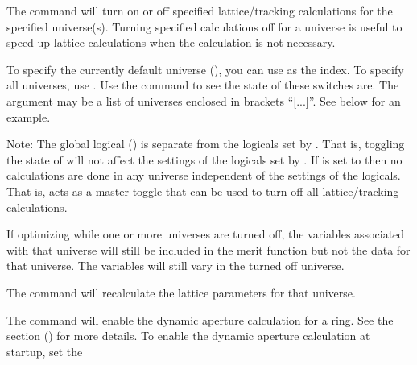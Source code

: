 {{{{{{The  command will turn on or off specified lattice/tracking
calculations for the specified universe(s). Turning specified calculations off for a universe is
useful to speed up lattice calculations when the calculation is not necessary. 

To specify the currently default universe (), you can use  as the
 index. To specify all universes, use \vn{*}. Use the  command
to see the state of these switches are. The  argument may be a list of universes
enclosed in brackets ``[...]''. See below for an example.

Note: The global logical  () is separate from the logicals set
by . That is, toggling the state of  will not affect the
settings of the logicals set by . If  is set to  then
no calculations are done in any universe independent of the settings of the 
logicals. That is,  acts as a master toggle that can be used to turn off all
lattice/tracking calculations.

If optimizing while one or more universes are turned off, the variables associated with that
universe will still be included in the merit function but not the data for that universe. The
variables will still vary in the turned off universe.

The  command will recalculate the lattice parameters
for that universe.

The  command will enable the dynamic aperture
calculation for a ring. See the  section () for
more details. To enable the dynamic aperture calculation at startup, set the
\vn{design_lattice(i)%

The \vn{set universe <what_universe> one_turn_map_calc} command will enable a one-turn-map
calculation for a ring using PTC, and populate the normal form taylor maps. See
Eq.~\ref{normalform1} and Eq.~\ref{normalform2} in the \vn{normal.} data type. To enable the map
calculation at startup, set the \vn{design_lattice(i)%
(\sref{s:init.lat}).

The commands
\begin{example}
  set universe <what_universe> twiss_calc  and
  set universe <what_universe> track_calc
\end{example}
will set whether the 6x6 transfer matrices and the central orbit (closed orbit for circular rings)
is calculated for a given universe. Turning this off is useful in speeding up calculations in the
case where the transfer matrices and/or orbit is not being used.

}}}}}}}}
